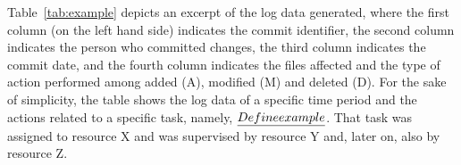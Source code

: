 Table~\ref{tab:example} depicts an excerpt of the log data generated, where the first column (on the left hand side) indicates the commit identifier, the second column indicates the person who committed changes, the third column indicates the commit date, %
and the fourth column indicates the files affected and the type of action performed among added (A), modified (M) and deleted (D).
For the sake of simplicity, the table shows the log data of a specific time period and the actions related to a specific task, namely, $\emph{Define example}$. That task was assigned to resource X %
and was supervised by resource Y and, later on, also by resource Z.

